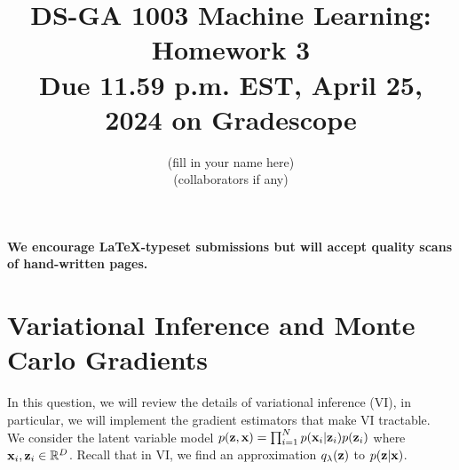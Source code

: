 \documentclass[11pt]{article}
\begin{document}
\title{DS-GA 1003 Machine Learning: Homework 3 \\
\textbf{\large{Due 11.59 p.m. EST, April 25, 2024 on Gradescope}}}
\author{{\color{blue}(fill in your name here)}\\
    {\color{blue}(collaborators if any)}}
\date{}
\maketitle

\noindent \textbf{We encourage \LaTeX-typeset submissions but will accept quality scans of hand-written pages.}

\section{Variational Inference and Monte Carlo Gradients}

In this question, we will review the details of variational inference (VI), in particular, we will implement the gradient estimators that make VI tractable.\\  

\noindent We consider the latent variable model $p({\mathbf z}, {\mathbf x}) = \prod_{i=1}^N p({\mathbf x}_i|{\mathbf z}_i)p({\mathbf z}_i)$ where ${\mathbf x}_i,{\mathbf z}_i \in \mathbb{R}^D$. Recall that in VI, we find an approximation  $q_\lambda({\mathbf z})$ to $p({\mathbf z} | {\mathbf x})$. 
\end{document}
